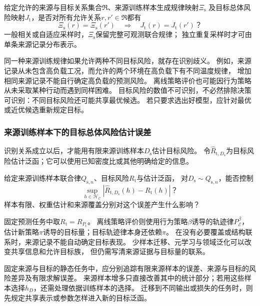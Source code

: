 \begin{mathproblem}[来源训练规律是否确定目标总体风险]
  \label{question:future-source-target}
  给定允许的来源与目标关系集合$\mathfrak R$、来源训练样本生成规律映射$\Xi_{\mathrm s}$
  及目标总体风险映射$J_{\mathrm t}$，是否对所有允许关系$r,r'\in\mathfrak R$都有
  \[
    \Xi_{\mathrm s}(r)=\Xi_{\mathrm s}(r')
    \quad\Longrightarrow\quad J_{\mathrm t}(r)=J_{\mathrm t}(r')\text{？}
  \]
  一般相关或自适应采样时，$\Xi_{\mathrm s}$保留完整可观测联合规律；
  独立重复采样时才可由单条来源记录分布表示。
\end{mathproblem}

同一种来源训练规律如果允许两种不同目标风险，就存在识别歧义。
例如，来源记录从未包含高负载工况，而允许的两个环境在高负载下有不同温度规律，
增加相同来源记录不能自行确定高负载的预测风险。
离线策略评价也可能因行为策略从未采取某种行动而遇到同样困难。
目标风险的数值不可识别，不必然排除决策可识别：不同目标风险还可能共享最优候选。
若只要求选出好模型，应针对最优或近优候选重新规定目标。

\subsubsection{来源训练样本下的目标总体风险估计误差}
\label{sec:future-analysis-source-target-estimation}

识别关系成立以后，才能用有限来源训练样本$D_{\mathrm s}$估计目标风险。
令$\widehat R_{\mathrm t,D_{\mathrm s}}$为目标风险估计泛函；它可以使用已知密度比或其他明确给定的信息。

\begin{mathproblem}[有限来源训练样本的目标风险误差]
  \label{question:future-source-target-estimation}
  给定来源训练样本联合律$Q_{{\mathrm s},n}$、目标风险$R_{\mathrm t}$与估计泛函，
  对$D_{\mathrm s}\sim Q_{{\mathrm s},n}$，能否控制
  \[
    \sup_{h\in\mathcal H_{\mathcal C}}
    |\widehat R_{\mathrm t,D_{\mathrm s}}(h)-R_{\mathrm t}(h)|\text{？}
  \]
  样本有限、权重估计和来源覆盖分别对这个误差产生什么影响？
\end{mathproblem}



固定预测任务中取$R_{\mathrm t}=R_{P_{\mathrm t}}$。
离线策略评价则使用行为策略$\beta$诱导的轨迹律$P_{\mathcal E}^{\beta}$，
估计新策略$\pi$诱导的目标量；目标轨迹律本身还依赖$\pi$。
在没有必要覆盖或结构联系时，来源记录不能自动确定目标表现。
少样本迁移、元学习与领域泛化可以改变共享信息和允许目标族，
但仍需写清来源证据与目标量的联系。

固定来源与目标的静态任务中，应分别追踪有限来源样本的误差、来源与目标的风险差异及有限求解误差。
来源样本增多只直接改善其中的统计部分；若用这些样本选择$h_D$，还需处理依据训练样本的选择。
迁移到不同输出或损失的任务时，则先规定共享表示或参数怎样进入新的目标泛函。

